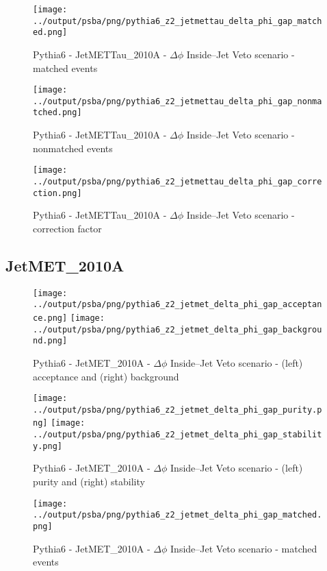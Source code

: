 \documentclass[11pt]{book}
\begin{document}
\begin{figure}[ht]
\centering
\texttt{[image: ../output/psba/png/pythia6\_z2\_jetmettau\_delta\_phi\_gap\_matched.png]}
\caption{Pythia6 - JetMETTau\_2010A - $\Delta\phi$ Inside--Jet Veto scenario - matched events}
\label{fig:p6_jetmettau_delta_phi_gap_matched}
\end{figure}

\begin{figure}[ht]
\centering
\texttt{[image: ../output/psba/png/pythia6\_z2\_jetmettau\_delta\_phi\_gap\_nonmatched.png]}
\caption{Pythia6 - JetMETTau\_2010A - $\Delta\phi$ Inside--Jet Veto scenario - nonmatched events}
\label{fig:p6_jetmettau_delta_phi_gap_nonmatched}
\end{figure}

\begin{figure}[ht]
\centering
\texttt{[image: ../output/psba/png/pythia6\_z2\_jetmettau\_delta\_phi\_gap\_correction.png]}
\caption{Pythia6 - JetMETTau\_2010A - $\Delta\phi$ Inside--Jet Veto scenario - correction factor}
\label{fig:p6_jetmettau_delta_phi_gap_correction}
\end{figure}


\clearpage
\subsection{JetMET\_2010A}

\begin{figure}[ht]
\centering
\texttt{[image: ../output/psba/png/pythia6\_z2\_jetmet\_delta\_phi\_gap\_acceptance.png]}
\texttt{[image: ../output/psba/png/pythia6\_z2\_jetmet\_delta\_phi\_gap\_background.png]}
\caption{Pythia6 - JetMET\_2010A - $\Delta\phi$ Inside--Jet Veto scenario - (left) acceptance and (right) background}
\label{fig:p6_jetmet_delta_phi_gap_ab}
\end{figure}

\begin{figure}[ht]
\centering
\texttt{[image: ../output/psba/png/pythia6\_z2\_jetmet\_delta\_phi\_gap\_purity.png]}
\texttt{[image: ../output/psba/png/pythia6\_z2\_jetmet\_delta\_phi\_gap\_stability.png]}
\caption{Pythia6 - JetMET\_2010A - $\Delta\phi$ Inside--Jet Veto scenario - (left) purity and (right) stability}
\label{fig:p6_jetmet_delta_phi_gap_ps}
\end{figure}

\begin{figure}[ht]
\centering
\texttt{[image: ../output/psba/png/pythia6\_z2\_jetmet\_delta\_phi\_gap\_matched.png]}
\caption{Pythia6 - JetMET\_2010A - $\Delta\phi$ Inside--Jet Veto scenario - matched events}
\label{fig:p6_jetmet_delta_phi_gap_matched}
\end{figure}
\end{document}
